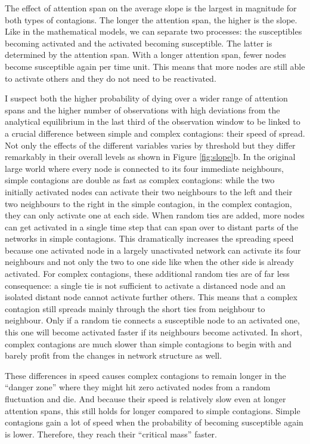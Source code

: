 \documentclass[a4paper,12pt]{article}
\begin{document}
The effect of attention span on the average slope is the largest in magnitude for both types of contagions. The longer the attention span, the higher is the slope. Like in the mathematical models, we can separate two processes: the susceptibles becoming activated and the activated becoming susceptible. The latter is determined by the attention span. With a longer attention span, fewer nodes become susceptible again per time unit. This means that more nodes are still able to activate others and they do not need to be reactivated.

I suspect both the higher probability of dying over a wider range of attention spans and the higher number of observations with high deviations from the analytical equilibrium in the last third of the observation window to be linked to a crucial difference between simple and complex contagions: their speed of spread. Not only the effects of the different variables varies by threshold but they differ remarkably in their overall levels as shown in Figure \ref{fig:slope}b. In the original large world where every node is connected to its four immediate neighbours, simple contagions are double as fast as complex contagions: while the two initially activated nodes can activate their two neighbours to the left and their two neighbours to the right in the simple contagion, in the complex contagion, they can only activate one at each side. When random ties are added, more nodes can get activated in a single time step that can span over to distant parts of the networks in simple contagions. This dramatically increases the spreading speed because one activated node in a largely unactivated network can activate its four neighbours and not only the two to one side like when the other side is already activated. For complex contagions, these additional random ties are of far less consequence: a single tie is not sufficient to activate a distanced node and an isolated distant node cannot activate further others. This means that a complex contagion still spreads mainly through the short ties from neighbour to neighbour. Only if a random tie connects a susceptible node to an activated one, this one will become activated faster if its neighbours become activated. In short, complex contagions are much slower than simple contagions to begin with and barely profit from the changes in network structure as well.

These differences in speed causes complex contagions to remain longer in the ``danger zone'' where they might hit zero activated nodes from a random fluctuation and die. And because their speed is relatively slow even at longer attention spans, this still holds for longer compared to simple contagions. Simple contagions gain a lot of speed when the probability of becoming susceptible again is lower. Therefore, they reach their ``critical mass'' faster. 
\end{document}
